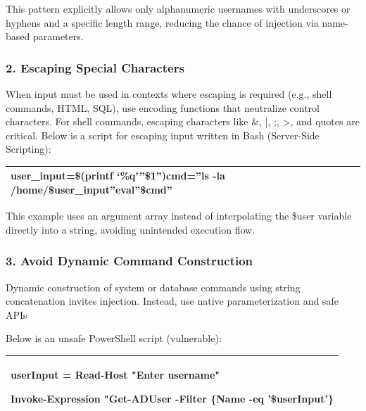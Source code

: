This pattern explicitly allows only alphanumeric usernames with underscores or hyphens and a specific length range, reducing the chance of injection via name-based parameters.

\subsubsection{2. Escaping Special Characters}

When input must be used in contexts where escaping is required (e.g., shell commands, HTML, SQL), use encoding functions that neutralize control characters. For shell commands, escaping characters like \&, |, ;, >, and quotes are critical. Below is a script for escaping input written in Bash (Server-Side Scripting):

\begin{table}
\centering

\begin{tabular}{| l |}
\hline
user\_input=\$(printf ‘\%q’”\$1”)cmd=”ls -la /home/\$user\_input”eval”\$cmd” \\
\hline

\end{tabular}

\end{table}

This example uses an argument array instead of interpolating the \$user variable directly into a string, avoiding unintended execution flow.

\subsubsection{3. Avoid Dynamic Command Construction}

Dynamic construction of system or database commands using string concatenation invites injection. Instead, use native parameterization and safe APIs

Below is an unsafe PowerShell script (vulnerable):

\begin{table}
\centering

\begin{tabular}{| l |}
\hline
userInput = Read-Host "Enter username"

Invoke-Expression "Get-ADUser -Filter \{Name -eq '\$userInput'\} \\
\hline

\end{tabular}

\end{table}

